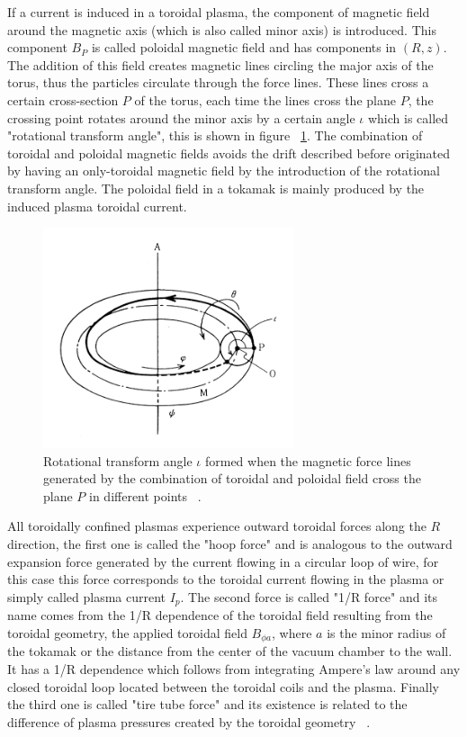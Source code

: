 If a current is induced in a toroidal plasma, the component of magnetic field around the magnetic axis (which is also called minor axis) is introduced. This component $B_P$ is called poloidal magnetic field and has components in $(R,z)$. The addition of this field creates magnetic lines circling the major axis of the torus, thus the particles circulate through the force lines. These lines cross a certain cross-section $P$ of the torus, each time the lines cross the plane $P$, the crossing point rotates around the minor axis by a certain angle $\iota$ which is called "rotational transform angle", this is shown in figure ~\ref{rot_angle}. The combination of toroidal and poloidal magnetic fields avoids the drift  described before originated by having an only-toroidal magnetic field by the introduction of the  rotational transform angle. The poloidal field in a tokamak is mainly produced by the induced plasma toroidal current.  \smallskip

\begin{figure}
	\centering
	\includegraphics[width=0.655\textwidth]{Chp1/rotational_angle.png}
	\caption{Rotational transform angle $\iota$ formed when the magnetic force lines generated by the combination of toroidal and poloidal field cross the plane $P$ in different points  ~\cite[Chapter~3]{Miyamoto2011}. \label{rot_angle}}
\end{figure}

 All toroidally confined plasmas experience  outward toroidal forces along the $R$ direction, the first one is called the "hoop force" and is analogous to  the outward expansion force generated by the current flowing in a circular loop of wire, for this case this force corresponds to the toroidal current flowing in the plasma or simply called plasma current $I_p$. The second force is called "1/R force" and its name comes from the 1/R dependence of the toroidal field resulting from the toroidal geometry, the applied toroidal field $B_{\phi a}$,  where $a$ is the minor radius of the tokamak or the distance from the center of the vacuum chamber to the wall. It has a 1/R dependence which follows from integrating Ampere's law around any closed toroidal loop located between the toroidal coils and the plasma. Finally the third one is called "tire tube force" and its existence is related to the difference of plasma pressures created by the toroidal geometry ~\cite[Chapter~11]{Freidberg2007}. \smallskip 
 

